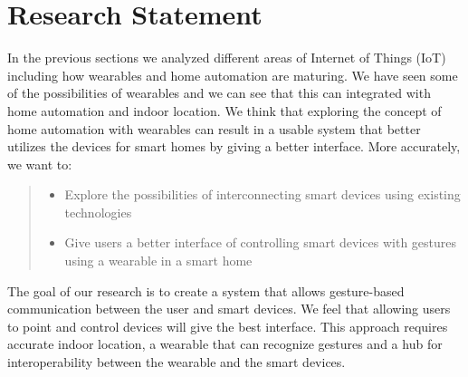 \section{Research Statement}
In the previous sections we analyzed different areas of Internet of Things (IoT) including how wearables and home automation are maturing. 
We have seen some of the possibilities of wearables and we can see that this can integrated with home automation and indoor location.
We think that exploring the concept of home automation with wearables can result in a usable system that better utilizes the devices for smart homes by giving a better interface. 
More accurately, we want to:

\begin{quote}
    \begin{itemize}
        \item Explore the possibilities of interconnecting smart devices using existing technologies  
        \item Give users a better interface of controlling smart devices with gestures using a wearable in a smart home 
    \end{itemize}    
\end{quote}

The goal of our research is to create a system that allows gesture-based communication between the user and smart devices.
We feel that allowing users to point and control devices will give the best interface. 
This approach requires accurate indoor location, a wearable that can recognize gestures and a hub for interoperability between the wearable and the smart devices. 